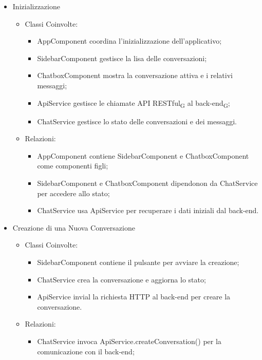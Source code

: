 \begin{itemize}
    \item Inizializzazione
    \begin{itemize}
        \item Classi Coinvolte:
        \begin{itemize}
            \item AppComponent coordina l'inizializzazione dell'applicativo;
            \item SidebarComponent gestisce la lisa delle conversazioni;
            \item ChatboxComponent mostra la conversazione attiva e i relativi messaggi;
            \item ApiService gestisce le chiamate API RESTful\textsubscript{G} al back-end\textsubscript{G};
            \item ChatService gestisce lo stato delle conversazioni e dei messaggi.
        \end{itemize}
        \item Relazioni:
        \begin{itemize}
            \item AppComponent contiene SidebarComponent e ChatboxComponent come componenti figli;
            \item SidebarComponent e ChatboxComponent dipendonon da ChatService per accedere allo stato;
            \item ChatService usa ApiService per recuperare i dati iniziali dal back-end.
        \end{itemize}
    \end{itemize}
    \item Creazione di una Nuova Conversazione
    \begin{itemize}
        \item Classi Coinvolte:
        \begin{itemize}
            \item SidebarComponent contiene il pulsante per avviare la creazione;
            \item ChatService crea la conversazione e aggiorna lo stato;
            \item ApiService invial la richiesta HTTP al back-end per creare la conversazione.
        \end{itemize}
        \item Relazioni:
        \begin{itemize}
            \item ChatService invoca ApiService.createConversation() per la comunicazione con il back-end;

\end{itemize}
\end{itemize}
\end{itemize}
